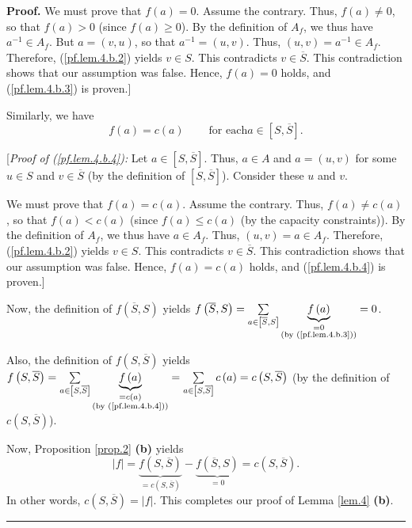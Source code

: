 \documentclass[numbers=enddot,12pt,final,onecolumn,notitlepage]{scrartcl}%
\theoremstyle{definition}
\newenvironment{proof}[1][Proof]{\noindent\textbf{#1.} }{\ \rule{0.5em}{0.5em}}
\let\sumnonlimits\sum
\renewcommand{\sum}{\sumnonlimits\limits}
\begin{document}
\begin{proof}
We must prove that $f\left(  a\right)  =0$. Assume the contrary. Thus,
$f\left(  a\right)  \neq0$, so that $f\left(  a\right)  >0$ (since $f\left(
a\right)  \geq0$). By the definition of $A_{f}$, we thus have $a^{-1}\in
A_{f}$. But $a=\left(  v,u\right)  $, so that $a^{-1}=\left(  u,v\right)  $.
Thus, $\left(  u,v\right)  =a^{-1}\in A_{f}$. Therefore, (\ref{pf.lem.4.b.2})
yields $v\in S$. This contradicts $v\in\overline{S}$. This contradiction shows
that our assumption was false. Hence, $f\left(  a\right)  =0$ holds, and
(\ref{pf.lem.4.b.3}) is proven.]

Similarly, we have%
\begin{equation}
f\left(  a\right)  =c\left(  a\right)  \ \ \ \ \ \ \ \ \ \ \text{for each
}a\in\left[  S,\overline{S}\right]  . \label{pf.lem.4.b.4}%
\end{equation}


[\textit{Proof of (\ref{pf.lem.4.b.4}):} Let $a\in\left[  S,\overline
{S}\right]  $. Thus, $a\in A$ and $a=\left(  u,v\right)  $ for some $u\in S$
and $v\in\overline{S}$ (by the definition of $\left[  S,\overline{S}\right]
$). Consider these $u$ and $v$.

We must prove that $f\left(  a\right)  =c\left(  a\right)  $. Assume the
contrary. Thus, $f\left(  a\right)  \neq c\left(  a\right)  $, so that
$f\left(  a\right)  <c\left(  a\right)  $ (since $f\left(  a\right)  \leq
c\left(  a\right)  $ (by the capacity constraints)). By the definition of
$A_{f}$, we thus have $a\in A_{f}$. Thus, $\left(  u,v\right)  =a\in A_{f}$.
Therefore, (\ref{pf.lem.4.b.2}) yields $v\in S$. This contradicts
$v\in\overline{S}$. This contradiction shows that our assumption was false.
Hence, $f\left(  a\right)  = c \left(a\right)$ holds, and
(\ref{pf.lem.4.b.4}) is proven.]

Now, the definition of $f\left(  \overline{S},S\right)  $ yields $f\left(
\overline{S},S\right)  =\sum_{a\in\left[  \overline{S},S\right]
}\underbrace{f\left(  a\right)  }_{\substack{=0\\\text{(by (\ref{pf.lem.4.b.3}%
))}}}=0$.

Also, the definition of $f\left(  S,\overline{S}\right)  $ yields $f\left(
S,\overline{S}\right)  =\sum_{a\in\left[  S,\overline{S}\right]
}\underbrace{f\left(  a\right)  }_{\substack{=c\left(  a\right)  \\\text{(by
(\ref{pf.lem.4.b.4}))}}}=\sum_{a\in\left[  S,\overline{S}\right]  }c\left(
a\right)  =c\left(  S,\overline{S}\right)  $ (by the definition of $c\left(
S,\overline{S}\right)  $).

Now, Proposition \ref{prop.2} \textbf{(b)} yields%
\[
\left\vert f\right\vert =\underbrace{f\left(  S,\overline{S}\right)
}_{=c\left(  S,\overline{S}\right)  }-\underbrace{f\left(  \overline
{S},S\right)  }_{=0}=c\left(  S,\overline{S}\right)  .
\]
In other words, $c\left(  S,\overline{S}\right)  =\left\vert f\right\vert $.
This completes our proof of Lemma \ref{lem.4} \textbf{(b)}.
\end{proof}
\end{document}
